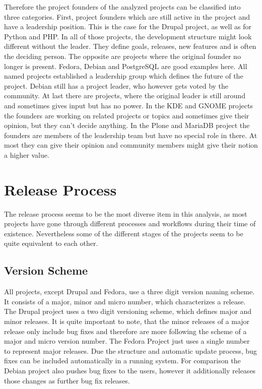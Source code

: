 Therefore the project founders of the analyzed projects can be classified into
three categories. First, project founders which are still active in the project
and have a leadership position. This is the case for the Drupal project, as
well as for Python and PHP. In all of those projects, the development structure
might look different without the leader. They define goals, releases, new
features and is often the deciding person. The opposite are projects where the
original founder no longer is present. Fedora, Debian and PostgreSQL are good
examples here. All named projects established a leadership group which defines
the future of the project. Debian still has a project leader, who however gets
voted by the community. At last there are projects, where the original leader
is still around and sometimes gives input but has no power. In the KDE and
GNOME projects the founders are working on related projects or topics and
sometimes give their opinion, but they can't decide anything. In the Plone and
MariaDB project the founders are members of the leadership team but have no
special role in there. At most they can give their opinion and community
members might give their notion a higher value.



\section{Release Process} %

The release process seems to be the most diverse item in this analysis, as most
projects have gone through different processes and workflows during their time
of existence. Nevertheless some of the different stages of the projects seem to
be quite equivalent to each other.

\subsection{Version Scheme} %

All projects, except Drupal and Fedora, use a three digit version naming
scheme. It consists of a major, minor and micro number, which characterizes a
release. The Drupal project uses a two digit versioning scheme, which defines
major and minor releases. It is quite important to note, that the minor
releases of a major release only include bug fixes and therefore are more
following the scheme of a major and micro version number. The Fedora Project
just uses a single number to represent major releases. Due the structure and
automatic update process, bug fixes can be included automatically in a running
system. For comparison the Debian project also pushes bug fixes to the users,
however it additionally releases those changes as further bug fix releases.

